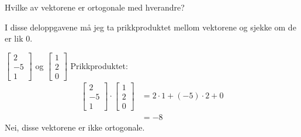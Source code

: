 \documentclass[11pt, a4paper, norsk]{NTNUoving}
\begin{document}
   \begin{oppgave}
       Hvilke av vektorene er ortogonale med hverandre?
       
       I disse deloppgavene må jeg ta prikkproduktet mellom vektorene og sjekke om de er lik 0.
       \begin{punkt}
           $
            \begin{bmatrix}
                2 \\
                -5 \\
                1
            \end{bmatrix}
           $ og $
            \begin{bmatrix}
                1 \\
                2 \\
                0
            \end{bmatrix}
           $
           Prikkproduktet:
           \begin{align*}
               \begin{bmatrix}
                   2 \\
                   -5 \\
                   1
               \end{bmatrix} \cdot \begin{bmatrix}
                   1 \\
                   2 \\
                   0
               \end{bmatrix} &= 2 \cdot 1 + (-5) \cdot 2 + 0
               \\
               &= -8
           \end{align*}
           Nei, disse vektorene er ikke ortogonale.
       \end{punkt}
\end{oppgave}
\end{document}
